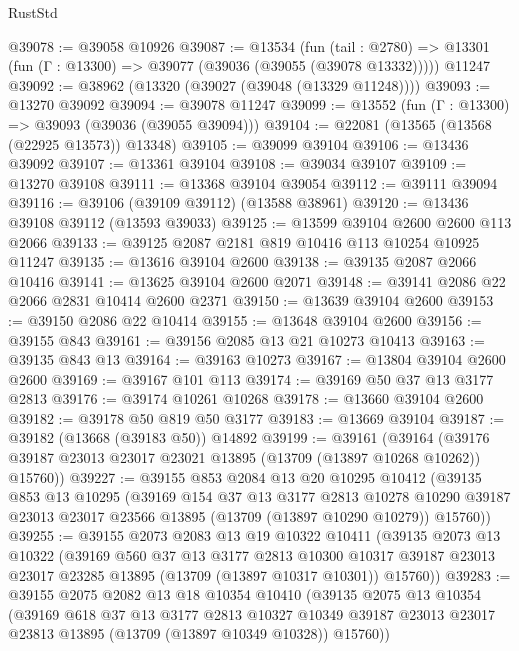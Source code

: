 \begin{lexlean}{RustStd}
\begin{coremodule}
@39078 := @39058 @10926
@39087 := @13534
    (fun (tail : @2780) => @13301 (fun (Γ : @13300) => @39077 (@39036 (@39055 (@39078 @13332)))))
    @11247
@39092 := @38962 (@13320 (@39027 (@39048 (@13329 @11248))))
@39093 := @13270 @39092
@39094 := @39078 @11247
@39099 := @13552 (fun (Γ : @13300) => @39093 (@39036 (@39055 @39094)))
@39104 := @22081 (@13565 (@13568 (@22925 @13573)) @13348)
@39105 := @39099 @39104
@39106 := @13436 @39092
@39107 := @13361 @39104
@39108 := @39034 @39107
@39109 := @13270 @39108
@39111 := @13368 @39104 @39054
@39112 := @39111 @39094
@39116 := @39106 (@39109 @39112) (@13588 @38961)
@39120 := @13436 @39108 @39112 (@13593 @39033)
@39125 := @13599 @39104 @2600 @2600 @113 @2066
@39133 := @39125 @2087 @2181 @819 @10416 @113 @10254 @10925 @11247
@39135 := @13616 @39104 @2600
@39138 := @39135 @2087 @2066 @10416
@39141 := @13625 @39104 @2600 @2071
@39148 := @39141 @2086 @22 @2066 @2831 @10414 @2600 @2371
@39150 := @13639 @39104 @2600
@39153 := @39150 @2086 @22 @10414
@39155 := @13648 @39104 @2600
@39156 := @39155 @843
@39161 := @39156 @2085 @13 @21 @10273 @10413
@39163 := @39135 @843 @13
@39164 := @39163 @10273
@39167 := @13804 @39104 @2600 @2600
@39169 := @39167 @101 @113
@39174 := @39169 @50 @37 @13 @3177 @2813
@39176 := @39174 @10261 @10268
@39178 := @13660 @39104 @2600
@39182 := @39178 @50 @819 @50 @3177
@39183 := @13669 @39104
@39187 := @39182 (@13668 (@39183 @50)) @14892
@39199 := @39161
    (@39164 (@39176 @39187 @23013 @23017 @23021 @13895 (@13709 (@13897 @10268 @10262)) @15760))
@39227 := @39155
    @853
    @2084
    @13
    @20
    @10295
    @10412
    (@39135
      @853
      @13
      @10295
      (@39169
        @154
        @37
        @13
        @3177
        @2813
        @10278
        @10290
        @39187
        @23013
        @23017
        @23566
        @13895
        (@13709 (@13897 @10290 @10279))
        @15760))
@39255 := @39155
    @2073
    @2083
    @13
    @19
    @10322
    @10411
    (@39135
      @2073
      @13
      @10322
      (@39169
        @560
        @37
        @13
        @3177
        @2813
        @10300
        @10317
        @39187
        @23013
        @23017
        @23285
        @13895
        (@13709 (@13897 @10317 @10301))
        @15760))
@39283 := @39155
    @2075
    @2082
    @13
    @18
    @10354
    @10410
    (@39135
      @2075
      @13
      @10354
      (@39169
        @618
        @37
        @13
        @3177
        @2813
        @10327
        @10349
        @39187
        @23013
        @23017
        @23813
        @13895
        (@13709 (@13897 @10349 @10328))
        @15760))

\end{coremodule}
\end{lexlean}
